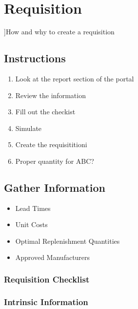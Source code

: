 \documentclass[letterpaper,10pt,english]{sphinxmanual}
\begin{document}
\chapter{Requisition}
\label{Portal/750-Requisitions:requisition}\label{Portal/750-Requisitions::doc}
{]}How and why to create a requisition


\section{Instructions}
\label{Portal/750-Requisitions:instructions}\begin{enumerate}
\item {} 
Look at the report section of the portal

\item {} 
Review the information

\item {} 
Fill out the checkist

\item {} 
Simulate

\item {} 
Create the requisititioni

\item {} 
Proper quantity for ABC?

\end{enumerate}


\section{Gather Information}
\label{Portal/750-Requisitions:gather-information}\begin{itemize}
\item {} 
Lead Times

\item {} 
Unit Costs

\item {} 
Optimal Replenishment Quantities

\item {} 
Approved Manufacturers

\end{itemize}


\subsection{Requisition Checklist}
\label{Portal/750-Requisitions:requisition-checklist}

\subsection{Intrinsic Information}
\label{Portal/750-Requisitions:intrinsic-information}
\end{document}
